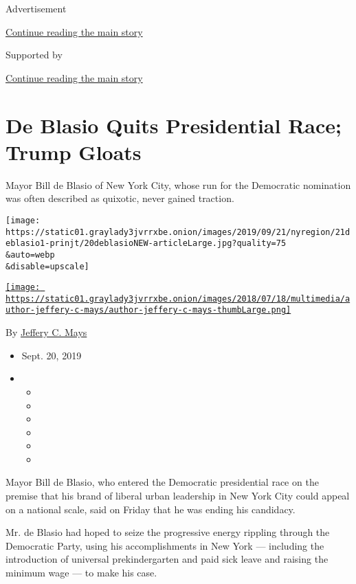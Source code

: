 Advertisement

\protect\hyperlink{after-top}{Continue reading the main story}

Supported by

\protect\hyperlink{after-sponsor}{Continue reading the main story}

\hypertarget{de-blasio-quits-presidential-race-trump-gloats}{%
\section{De Blasio Quits Presidential Race; Trump
Gloats}\label{de-blasio-quits-presidential-race-trump-gloats}}

Mayor Bill de Blasio of New York City, whose run for the Democratic
nomination was often described as quixotic, never gained traction.

\texttt{[image: https://static01.graylady3jvrrxbe.onion/images/2019/09/21/nyregion/21deblasio1-prinjt/20deblasioNEW-articleLarge.jpg?quality=75\\\&auto=webp\\\&disable=upscale]}

\href{https://www.nytimes3xbfgragh.onion/by/jeffery-c-mays}{\texttt{[image: https://static01.graylady3jvrrxbe.onion/images/2018/07/18/multimedia/author-jeffery-c-mays/author-jeffery-c-mays-thumbLarge.png]}}

By \href{https://www.nytimes3xbfgragh.onion/by/jeffery-c-mays}{Jeffery
C. Mays}

\begin{itemize}
\item
  Sept. 20, 2019
\item
  \begin{itemize}
  \item
  \item
  \item
  \item
  \item
  \item
  \end{itemize}
\end{itemize}

Mayor Bill de Blasio, who entered the Democratic presidential race on
the premise that his brand of liberal urban leadership in New York City
could appeal on a national scale, said on Friday that he was ending his
candidacy.

Mr. de Blasio had hoped to seize the progressive energy rippling through
the Democratic Party, using his accomplishments in New York ---
including the introduction of universal prekindergarten and paid sick
leave and raising the minimum wage --- to make his case.

